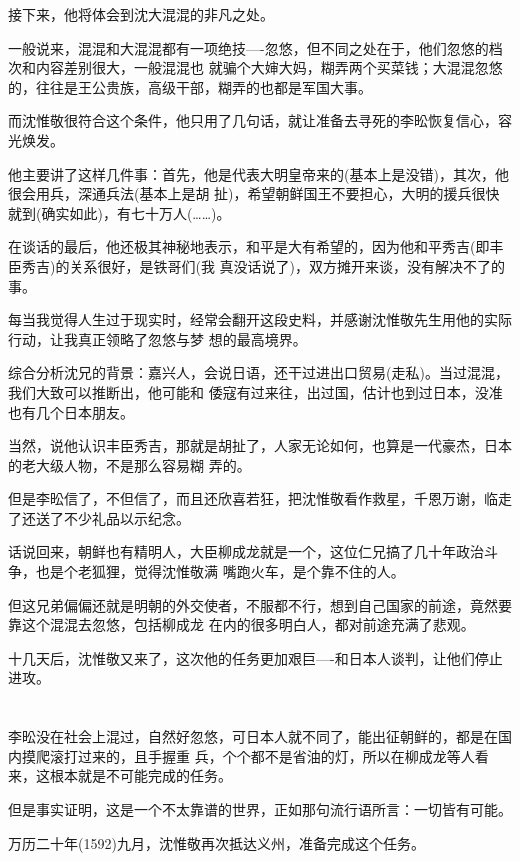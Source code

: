 \documentclass[11pt,a4paper,onecolumn]{article}
\begin{document}
接下来，他将体会到沈大混混的非凡之处。

一般说来，混混和大混混都有一项绝技----忽悠，但不同之处在于，他们忽悠的档次和内容差别很大，一般混混也
就骗个大婶大妈，糊弄两个买菜钱；大混混忽悠的，往往是王公贵族，高级干部，糊弄的也都是军国大事。

而沈惟敬很符合这个条件，他只用了几句话，就让准备去寻死的李昖恢复信心，容光焕发。

他主要讲了这样几件事：首先，他是代表大明皇帝来的(基本上是没错)，其次，他很会用兵，深通兵法(基本上是胡
扯)，希望朝鲜国王不要担心，大明的援兵很快就到(确实如此)，有七十万人(……)。

在谈话的最后，他还极其神秘地表示，和平是大有希望的，因为他和平秀吉(即丰臣秀吉)的关系很好，是铁哥们(我
真没话说了)，双方摊开来谈，没有解决不了的事。

每当我觉得人生过于现实时，经常会翻开这段史料，并感谢沈惟敬先生用他的实际行动，让我真正领略了忽悠与梦
想的最高境界。

综合分析沈兄的背景：嘉兴人，会说日语，还干过进出口贸易(走私)。当过混混，我们大致可以推断出，他可能和
倭寇有过来往，出过国，估计也到过日本，没准也有几个日本朋友。

当然，说他认识丰臣秀吉，那就是胡扯了，人家无论如何，也算是一代豪杰，日本的老大级人物，不是那么容易糊
弄的。

但是李昖信了，不但信了，而且还欣喜若狂，把沈惟敬看作救星，千恩万谢，临走了还送了不少礼品以示纪念。

话说回来，朝鲜也有精明人，大臣柳成龙就是一个，这位仁兄搞了几十年政治斗争，也是个老狐狸，觉得沈惟敬满
嘴跑火车，是个靠不住的人。

但这兄弟偏偏还就是明朝的外交使者，不服都不行，想到自己国家的前途，竟然要靠这个混混去忽悠，包括柳成龙
在内的很多明白人，都对前途充满了悲观。

十几天后，沈惟敬又来了，这次他的任务更加艰巨----和日本人谈判，让他们停止进攻。

\section[\thesection]{}

李昖没在社会上混过，自然好忽悠，可日本人就不同了，能出征朝鲜的，都是在国内摸爬滚打过来的，且手握重
兵，个个都不是省油的灯，所以在柳成龙等人看来，这根本就是不可能完成的任务。

但是事实证明，这是一个不太靠谱的世界，正如那句流行语所言：一切皆有可能。

万历二十年(1592)九月，沈惟敬再次抵达义州，准备完成这个任务。
\end{document}
